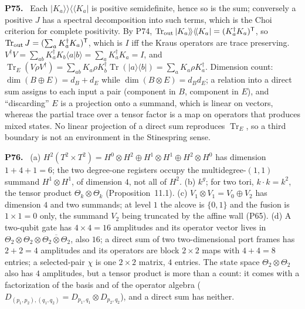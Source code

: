 \documentclass[11pt]{article}
\newcommand{\Tr}{\operatorname{Tr}}
\newenvironment{solution}[1]{\medskip\noindent\textbf{P#1.}\ }{\par\medskip}
\begin{document}
\begin{solution}{75}
Each $|K_a\rangle\!\rangle\langle\!\langle K_a|$ is positive semidefinite, hence so
is the sum; conversely a positive $J$ has a spectral decomposition into such
terms, which is the Choi criterion for complete positivity. By P74,
$\Tr_{\rm out}|K_a\rangle\!\rangle\langle\!\langle K_a| = (K_a^\dagger K_a)^{\mathsf T}$,
so $\Tr_{\rm out}J = (\sum_aK_a^\dagger K_a)^{\mathsf T}$, which is $I$ iff the
Kraus operators are trace preserving. $V^\dagger V = \sum_{ab}K_a^\dagger K_b\langle a|b\rangle = \sum_aK_a^\dagger K_a = I$,
and $\Tr_E(V\rho V^\dagger) = \sum_{ab}K_a\rho K_b^\dagger\Tr(|a\rangle\langle b|) = \sum_aK_a\rho K_a^\dagger$.
Dimension count: $\dim(B\oplus E) = d_B+d_E$ while $\dim(B\otimes E) = d_Bd_E$;
a relation into a direct sum assigns to each input a pair (component in $B$,
component in $E$), and ``discarding'' $E$ is a projection onto a summand,
which is linear on vectors, whereas the partial trace over a tensor factor is
a map on operators that produces mixed states. No linear projection of a
direct sum reproduces $\Tr_E$, so a third boundary is not an environment in
the Stinespring sense.
\end{solution}

\begin{solution}{76}
(a) $H^2(T^2\times T^2) = H^0\otimes H^2\oplus H^1\otimes H^1\oplus H^2\otimes H^0$
has dimension $1+4+1 = 6$; the two degree-one registers occupy the
multidegree-$(1,1)$ summand $H^1\otimes H^1$, of dimension $4$, not all of $H^2$.
(b) $k^g$; for two tori, $k\cdot k = k^2$, the tensor product $\Theta_k\otimes\Theta_k$
(Proposition~11.1). (c) $V_1\otimes V_1 = V_0\oplus V_2$ has dimension $4$ and
two summands; at level $1$ the alcove is $\{0,1\}$ and the fusion is
$1\times1 = 0$ only, the summand $V_2$ being truncated by the affine wall
(P65). (d) A two-qubit gate has $4\times4 = 16$ amplitudes and its operator
vector lives in $\Theta_2\otimes\Theta_2\otimes\overline{\Theta_2\otimes\Theta_2}$,
also $16$; a direct sum of two two-dimensional port frames has $2+2 = 4$
amplitudes and its operators are block $2\times2$ maps with $4+4 = 8$ entries;
a selected-pair $\chi$ is one $2\times2$ matrix, $4$ entries. The state space
$\Theta_2\otimes\Theta_2$ also has $4$ amplitudes, but a tensor product is
more than a count: it comes with a factorization of the basis and of the
operator algebra ($D_{(p_1,p_2),(q_1,q_2)} = D_{p_1,q_1}\otimes D_{p_2,q_2}$), and
a direct sum has neither.
\end{solution}
\end{document}
